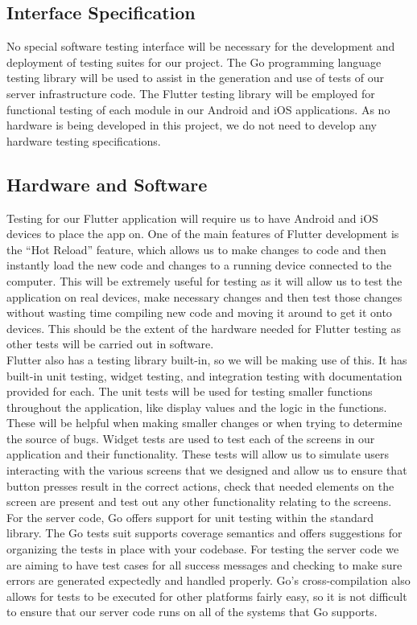 \documentclass[11pt]{article}
\begin{document}
\subsection{Interface Specification}
No special software testing interface will be necessary for the development and deployment of testing suites for our project. The Go programming language testing library will be used to assist in the generation and use of tests of our server infrastructure code. The Flutter testing library will be employed for functional testing of each module in our Android and iOS applications. As no hardware is being developed in this project, we do not need to develop any hardware testing specifications. 

\subsection{Hardware and Software}
Testing for our Flutter application will require us to have Android and iOS devices to place the app on. One of the main features of Flutter development is the “Hot Reload” feature, which allows us to make changes to code and then instantly load the new code and changes to a running device connected to the computer. This will be extremely useful for testing as it will allow us to test the application on real devices, make necessary changes and then test those changes without wasting time compiling new code and moving it around to get it onto devices. This should be the extent of the hardware needed for Flutter testing as other tests will be carried out in software.\\

Flutter also has a testing library built-in, so we will be making use of this. It has built-in unit testing, widget testing, and integration testing with documentation provided for each. The unit tests will be used for testing smaller functions throughout the application, like display values and the logic in the functions. These will be helpful when making smaller changes or when trying to determine the source of bugs. Widget tests are used to test each of the screens in our application and their functionality. These tests will allow us to simulate users interacting with the various screens that we designed and allow us to ensure that button presses result in the correct actions, check that needed elements on the screen are present and test out any other functionality relating to the screens.\\

For the server code, Go offers support for unit testing within the standard library. The Go tests suit supports coverage semantics and offers suggestions for organizing the tests in place with your codebase. For testing the server code we are aiming to have test cases for all success messages and checking to make sure errors are generated expectedly and handled properly. Go’s cross-compilation also allows for tests to be executed for other platforms fairly easy, so it is not difficult to ensure that our server code runs on all of the systems that Go supports.
\end{document}
